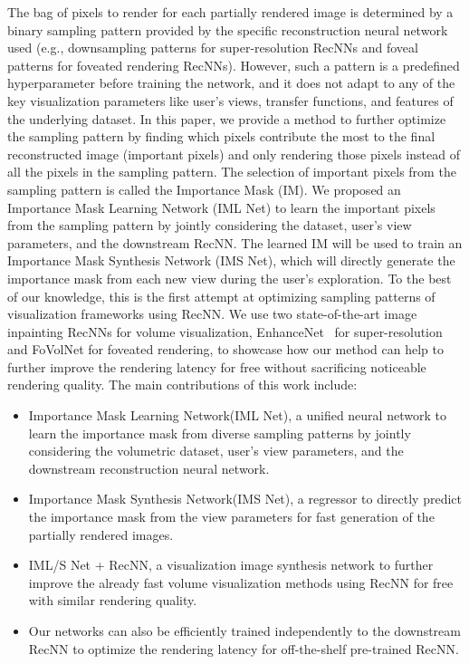 The bag of pixels to render for each partially rendered image is determined by a binary sampling pattern provided by the specific reconstruction neural network used (e.g., downsampling patterns for super-resolution RecNNs and foveal patterns for foveated rendering RecNNs). However, such a pattern is a predefined hyperparameter before training the network, and it does not adapt to any of the key visualization parameters like user's views, transfer functions, and features of the underlying dataset. In this paper, we provide a method to further optimize the sampling pattern by finding which pixels contribute the most to the final reconstructed image (important pixels) and only rendering those pixels instead of all the pixels in the sampling pattern. The selection of important pixels from the sampling pattern is called the Importance Mask (IM). We proposed an Importance Mask Learning Network (IML Net) to learn the important pixels from the sampling pattern by jointly considering the dataset, user's view parameters, and the downstream RecNN. The learned IM will be used to train an Importance Mask Synthesis Network (IMS Net), which will directly generate the importance mask from each new view during the user's exploration. To the best of our knowledge, this is the first attempt at optimizing sampling patterns of visualization frameworks using RecNN. We use two state-of-the-art image inpainting RecNNs for volume visualization, EnhanceNet~\cite{8237743} for super-resolution and FoVolNet\cite{9903564} for foveated rendering, to showcase how our method can help to further improve the rendering latency for free without sacrificing noticeable rendering quality. The main contributions of this work include:
\begin{itemize}[leftmargin=*]
  \item Importance Mask Learning Network(IML Net), a unified neural network to learn the importance mask from diverse sampling patterns by jointly considering the volumetric dataset, user's view parameters, and the downstream reconstruction neural network.
  \item Importance Mask Synthesis Network(IMS Net), a regressor to directly predict the importance mask from the view parameters for fast generation of the partially rendered images.
  \item IML/S Net + RecNN, a visualization image synthesis network to further improve the already fast volume visualization methods using RecNN for free with similar rendering quality.
  \item Our networks can also be efficiently trained independently to the downstream RecNN to optimize the rendering latency for off-the-shelf pre-trained RecNN.
\end{itemize}



